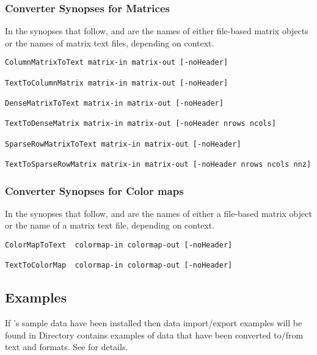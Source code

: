 \subsubsection{Converter Synopses for Matrices}

In the synopses that follow,  and 
are the names of either \sr{} file-based matrix objects or the names
of matrix text files, depending on context.

\begin{verbatim}
ColumnMatrixToText matrix-in matrix-out [-noHeader]

TextToColumnMatrix matrix-in matrix-out [-noHeader]

DenseMatrixToText matrix-in matrix-out [-noHeader]

TextToDenseMatrix matrix-in matrix-out [-noHeader nrows ncols]

SparseRowMatrixToText matrix-in matrix-out [-noHeader]

TextToSparseRowMatrix matrix-in matrix-out [-noHeader nrows ncols nnz]
\end{verbatim}

\subsubsection{Converter Synopses for Color maps}

In the synopses that follow,  and
 are the names of either a \sr{} file-based
matrix object or the name of a matrix text file, depending on context.

\begin{verbatim}
ColorMapToText  colormap-in colormap-out [-noHeader]

TextToColorMap  colormap-in colormap-out [-noHeader]
\end{verbatim}

\subsection{Examples}
\label{sec:converter_ex}

If \sr{}'s sample data have been installed then data import/export
examples will be found in 
Directory  contains examples of
data that have been converted to/from text and \sr{} formats.  See
 for details.

